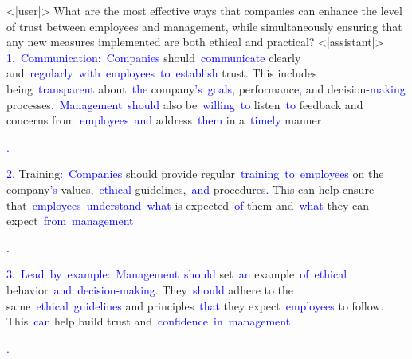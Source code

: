 \documentclass{article}
\begin{document}
\begin{tcolorbox}[colframe=black,colback=white]
<|user|>
What are the most effective ways that companies can enhance the level of trust between employees and management, while simultaneously ensuring that any new measures implemented are both ethical and practical?
<|assistant|>
\textcolor{blue}{1}\textcolor{blue}{.}\textcolor{blue}{~Communication}\textcolor{blue}{:}\textcolor{blue}{~Companies} should\textcolor{blue}{~communicate} clearly and\textcolor{blue}{~regularly}\textcolor{blue}{~with}\textcolor{blue}{~employees}\textcolor{blue}{~to}\textcolor{blue}{~establish} trust\textcolor{blue}{.} This includes being\textcolor{blue}{~transparent} about\textcolor{blue}{~the} company\textcolor{blue}{'s}\textcolor{blue}{~goals}, performance\textcolor{blue}{,} and decision\textcolor{blue}{-making} processes\textcolor{blue}{.}\textcolor{blue}{~Management}\textcolor{blue}{~should} also be\textcolor{blue}{~willing}\textcolor{blue}{~to} listen\textcolor{blue}{~to} feedback and concerns from\textcolor{blue}{~employees}\textcolor{blue}{~and} address\textcolor{blue}{~them} in a\textcolor{blue}{~timely} manner\textcolor{blue}{.

}\textcolor{blue}{2}\textcolor{blue}{.} Training\textcolor{blue}{:}\textcolor{blue}{~Companies} should provide regular\textcolor{blue}{~training}\textcolor{blue}{~to}\textcolor{blue}{~employees} on the company\textcolor{blue}{'s} values,\textcolor{blue}{~ethical} guidelines,\textcolor{blue}{~and} procedures\textcolor{blue}{.} This can help ensure that\textcolor{blue}{~employees}\textcolor{blue}{~understand}\textcolor{blue}{~what} is expected\textcolor{blue}{~of} them and\textcolor{blue}{~what} they can expect\textcolor{blue}{~from}\textcolor{blue}{~management}\textcolor{blue}{.

}\textcolor{blue}{3}\textcolor{blue}{.}\textcolor{blue}{~Lead}\textcolor{blue}{~by}\textcolor{blue}{~example}\textcolor{blue}{:}\textcolor{blue}{~Management}\textcolor{blue}{~should} set\textcolor{blue}{~an} example\textcolor{blue}{~of}\textcolor{blue}{~ethical} behavior\textcolor{blue}{~and}\textcolor{blue}{~decision}\textcolor{blue}{-making}\textcolor{blue}{.} They\textcolor{blue}{~should} adhere to the same\textcolor{blue}{~ethical}\textcolor{blue}{~guidelines} and principles\textcolor{blue}{~that} they expect\textcolor{blue}{~employees} to follow. This\textcolor{blue}{~can} help build trust and\textcolor{blue}{~confidence}\textcolor{blue}{~in}\textcolor{blue}{~management}\textcolor{blue}{.

}
\end{tcolorbox}
\end{document}
